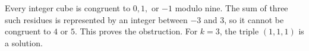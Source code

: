 Every integer cube is congruent to $0,1,$ or $-1$ modulo nine. The sum of three such residues is represented by an integer between $-3$ and $3$, so it cannot be congruent to $4$ or $5$. This proves the obstruction. For $k=3$, the triple $\boxed{(1,1,1)}$ is a solution.
